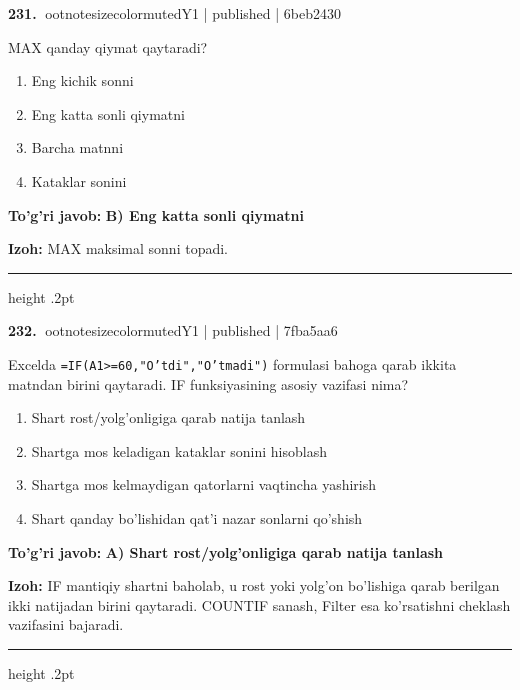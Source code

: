 \documentclass[10pt,a4paper]{article}
\begin{document}
\textbf{\color{ink}231.} {ootnotesizecolor{muted}Y1 | published | 6beb2430}
\par
MAX qanday qiymat qaytaradi?
\begin{enumerate}[label=\Alph*),leftmargin=9mm]
\item Eng kichik sonni
\item Eng katta sonli qiymatni
\item Barcha matnni
\item Kataklar sonini
\end{enumerate}
\begin{tcolorbox}[enhanced,breakable,colback=teal!4,colframe=teal!55!black,boxrule=0.45pt,arc=1.2mm,left=2.8mm,right=2.8mm,top=2mm,bottom=2mm]
\textbf{\color{teal}To'g'ri javob:} \textbf{B) Eng katta sonli qiymatni}
\par\smallskip
\textbf{Izoh:} MAX maksimal sonni topadi.
\end{tcolorbox}
\vspace{2mm}\hrule height .2pt\vspace{2mm}

\textbf{\color{ink}232.} {ootnotesizecolor{muted}Y1 | published | 7fba5aa6}
\par
Excelda \texttt{=IF(A1\textgreater{}=60,"O'tdi","O'tmadi")} formulasi bahoga qarab ikkita matndan birini qaytaradi. IF funksiyasining asosiy vazifasi nima?
\begin{enumerate}[label=\Alph*),leftmargin=9mm]
\item Shart rost/yolg'onligiga qarab natija tanlash
\item Shartga mos keladigan kataklar sonini hisoblash
\item Shartga mos kelmaydigan qatorlarni vaqtincha yashirish
\item Shart qanday bo'lishidan qat'i nazar sonlarni qo'shish
\end{enumerate}
\begin{tcolorbox}[enhanced,breakable,colback=teal!4,colframe=teal!55!black,boxrule=0.45pt,arc=1.2mm,left=2.8mm,right=2.8mm,top=2mm,bottom=2mm]
\textbf{\color{teal}To'g'ri javob:} \textbf{A) Shart rost/yolg'onligiga qarab natija tanlash}
\par\smallskip
\textbf{Izoh:} IF mantiqiy shartni baholab, u rost yoki yolg'on bo'lishiga qarab berilgan ikki natijadan birini qaytaradi. COUNTIF sanash, Filter esa ko'rsatishni cheklash vazifasini bajaradi.
\end{tcolorbox}
\vspace{2mm}\hrule height .2pt\vspace{2mm}
\end{document}
